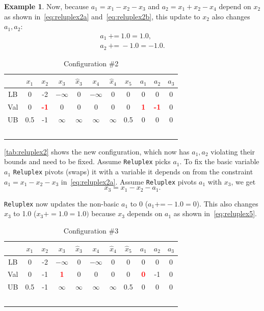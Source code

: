 \documentclass[oneside,11pt,dvipsnames]{book}
\numberwithin{equation}{section}
\theoremstyle{definition}
\newtheorem{example}{Example}[section]
\theoremstyle{remark}
\newcommand{\red}[1]{\textcolor{red}{#1}}
\newcommand{\reluplex}{\texttt{Reluplex}}
\begin{document}
\begin{example}
Now, because $a_1=x_1 - x_2 - x_3$ and $a_2=x_1 + x_2 - x_4$ depend on $x_2$ as shown in~\autoref{eq:reluplex2a} and~\autoref{eq:reluplex2b}, this update to $x_2$ also changes $a_1,a_2$:
    \begin{align*}
        a_1 ~\texttt{+=}~ 1.0 = 1.0, \\
        a_2 ~\texttt{+=}~ -1.0 = -1.0.
    \end{align*}

\begin{table}[h]
\caption{Configuration \#2}\label{tab:reluplex2}
    \centering
\small
\begin{tabular}{ccccccccccc}
     & $x_1$ & $x_2$ & $x_3$ & $\hat{x}_3$ & $x_4$ & $\hat{x}_4$ & $x_5$ &$a_1$&$a_2$&$a_3$ \\
    \midrule
    LB & 0 & -2 & $-\infty$&0&$-\infty$& 0 & 0 & 0 & 0 &0\\
    Val& 0 & \textbf{\red{-1}} & 0 & 0 & 0 & 0 & 0 & \textbf{\red{1}} & \textbf{\red{-1}} & 0\\
    UB & 0.5 & -1 &$\infty$&$\infty$&$\infty$&$\infty$&0.5& 0 & 0 & 0\\\
\end{tabular}
\end{table}

\autoref{tab:reluplex2} shows the new configuration, which now has $a_1, a_2$ violating their bounds and need to be fixed. Assume \reluplex{} picks $a_1$. To fix the basic variable $a_1$ \reluplex{} pivots (swaps) it with a variable it depends on from the constraint $ a_1 = x_1 - x_2 - x_3$ in~\autoref{eq:reluplex2a}. Assume \reluplex{} pivots $a_1$ with $x_3$, we get
\begin{equation}\label{eq:reluplex5}
x_3 = x_1 - x_2 - a_1.
\end{equation}

\reluplex{} now updates the non-basic $a_1$ to 0 ($a_1 \text{+=} -1.0 = 0$). This also changes $x_3$  to 1.0 ($x_3+=1.0 = 1.0)$ because $x_3$ depends on $a_1$ as shown in~\autoref{eq:reluplex5}.
\begin{table}[h]
\caption{Configuration \#3}\label{tab:reluplex3}
    \centering
    \small
\begin{tabular}{ccccccccccc}
     & $x_1$ & $x_2$ & $x_3$ & $\hat{x}_3$ & $x_4$ & $\hat{x}_4$ & $\hat{x}_5$ &$a_1$&$a_2$&$a_3$ \\
    \midrule
    LB & 0 & -2 & $-\infty$&0&$-\infty$& 0 & 0 & 0 & 0 &0\\
    Val& 0 & -1 & \textbf{\red{1}} & 0 & 0 & 0 & 0 & \textbf{\red{0}} & -1 & 0\\
    UB & 0.5 & -1 &$\infty$&$\infty$&$\infty$&$\infty$&0.5& 0 & 0 & 0\\\
\end{tabular}


\end{table}
\end{example}
\end{document}
